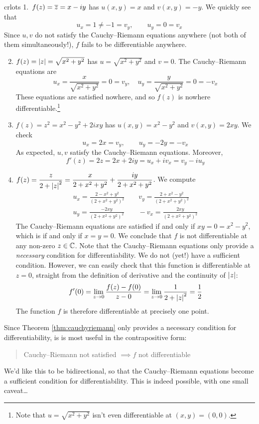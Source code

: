 \begin{examples}{}{crlots}
\hangindent\leftmargini
\textup{1.}\ $f(z)=\overline{z}=x-iy$ has $u(x,y)=x$ and $v(x,y)=-y$. We quickly see that
  \[u_x=1\neq -1=v_y,\qquad u_y=0=v_x\]
  Since $u,v$ do not satisfy the Cauchy--Riemann equations anywhere (not both of them simultaneously!), $f$ fails to be differentiable anywhere.
\begin{enumerate}\setcounter{enumi}{1}
  \item\label{exs:modnotdiff} $f(z)=\left| z\right|=\sqrt{x^2+y^2}$ has $u=\sqrt{x^2+y^2}$ and $v=0$. The Cauchy--Riemann equations are
  \[u_x=\frac{x}{\sqrt{x^2+y^2}}=0=v_y,\quad u_y=\frac{y}{\sqrt{x^2+y^2}}=0=-v_x\]
  These equations are satisfied nowhere, and so $f(z)$ is nowhere differentiable.\footnote{Note that $u=\sqrt{x^2+y^2}$ isn't even differentiable at $(x,y)=(0,0)$.}
  \item $f(z)=z^2=x^2-y^2+2ixy$ has $u(x,y)=x^2-y^2$ and $v(x,y)=2xy$. We check
  \[u_x=2x=v_y,\qquad u_y=-2y=-v_x\]
  As expected, $u,v$ satisfy the Cauchy--Riemann equations. Moreover,
  \[f'(z)=2z=2x+2iy =u_x+iv_x =v_y-iu_y\]
  
  \item\label{ex:cr3} $\displaystyle f(z)=\frac z{2+\left| z\right|^2}=\frac x{2+x^2+y^2}+\frac{iy}{2+x^2+y^2}$. We compute
  \begin{gather*}
  u_x=\frac{2-x^2+y^2}{(2+x^2+y^2)^2} \qquad v_y=\frac{2+x^2-y^2}{(2+x^2+y^2)^2}\\
  u_y=\frac{-2xy}{(2+x^2+y^2)^2} \qquad -v_x=\frac{2xy}{(2+x^2+y^2)^2}
  \end{gather*}
  The Cauchy--Riemann equations are satisfied if and only if $xy=0=x^2-y^2$, which is if and only if $x=y=0$. We conclude that $f$ is not differentiable at any non-zero $z\in\mathbb{C}$.\smallbreak
  Note that the Cauchy--Riemann equations only provide a \emph{necessary} condition for differentiability. We do not (yet!) have a sufficient condition. However, we can easily check that this function is differentiable at $z=0$, straight from the definition of derivative and the continuity of $\left| z\right|$:
  \[f'(0)=\lim_{z\to 0}\frac{f(z)-f(0)}{z-0}=\lim_{z\to 0}\frac 1{2+\left| z\right|^2}=\frac 12\]
  The function $f$ is therefore differentiable at precisely one point.
\end{enumerate}
\end{examples}

\vfil\goodbreak


Since Theorem \ref{thm:cauchyriemann} only provides a necessary condition for differentiability, is is most useful in the contrapositive form:
\begin{quote}
Cauchy--Riemann not satisfied $\implies f$ not differentiable 
\end{quote}
We'd like this to be bidirectional, so that the Cauchy--Riemann equations become a sufficient condition for differentiability. This is indeed possible, with one small caveat\ldots\smallbreak

